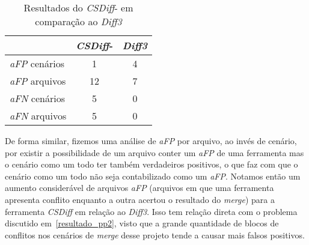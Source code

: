 \begin{table}[ht]
	\begin{center}
		\begin{tabular}{|l|c|c|}
			\hline
			\textbf{ }          & \textbf{\emph{CSDiff}-} & \textbf{\emph{Diff3}} \\
			\hline
			\emph{aFP} cenários & 1                       & 4                     \\
			\emph{aFP} arquivos & 12                      & 7                     \\
			\emph{aFN} cenários & 5                       & 0                     \\
			\emph{aFN} arquivos & 5                       & 0                     \\
			\hline
		\end{tabular}
	\end{center}
	\caption{Resultados do \emph{CSDiff}- em comparação ao \emph{Diff3}}\label{csdiff_minus_afp_afn}
\end{table}

De forma similar, fizemos uma análise de \emph{aFP} por arquivo, ao invés de
cenário, por existir a possibilidade de um arquivo conter um \emph{aFP} de uma
ferramenta mas o cenário como um todo ter também verdadeiros positivos, o que
faz com que o cenário como um todo não seja contabilizado como um \emph{aFP}.
Notamos então um aumento considerável de arquivos \emph{aFP} (arquivos em que
uma ferramenta apresenta conflito enquanto a outra acertou o resultado do
\emph{merge}) para a ferramenta \emph{CSDiff} em relação ao \emph{Diff3}. Isso
tem relação direta com o problema discutido em~\ref{resultado_pp2}, visto que a
grande quantidade de blocos de conflitos nos cenários de \emph{merge} desse
projeto tende a causar mais falsos positivos.


